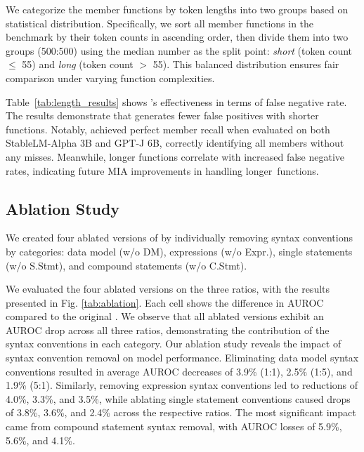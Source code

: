 We categorize the member functions by token lengths into two groups based on statistical distribution. Specifically, we sort all member functions in the benchmark by their token counts in ascending order, then divide them into two groups (500:500) using the median number as the split point: \textit{short} (token count $\leq$ 55) and \textit{long} (token count $>$ 55). This balanced distribution ensures fair comparison under varying function complexities. 

Table~\ref{tab:length_results} shows \tool's effectiveness in terms of false negative rate. The results demonstrate that \tool generates fewer false positives with shorter functions. Notably, \tool achieved perfect member recall when evaluated on both StableLM-Alpha 3B and GPT-J 6B, correctly identifying all members without any misses. Meanwhile, longer functions correlate with increased false negative rates, indicating future MIA improvements in handling longer~functions. 

\subsection{Ablation Study}

We created four ablated versions of \tool by individually removing syntax conventions by categories: data model (w/o DM), expressions (w/o Expr.), single statements (w/o S.Stmt), and compound statements (w/o C.Stmt). 

We evaluated the four ablated versions on the three ratios, with the results presented in Fig. \ref{tab:ablation}. Each cell shows the difference in AUROC compared to the original \tool. We observe that all ablated versions exhibit an AUROC drop across all three ratios, demonstrating the contribution of the syntax conventions in each category. Our ablation study reveals the impact of syntax convention removal on model performance. Eliminating data model syntax conventions resulted in average AUROC decreases of 3.9\% (1:1), 2.5\% (1:5), and 1.9\% (5:1). Similarly, removing expression syntax conventions led to reductions of 4.0\%, 3.3\%, and 3.5\%, while ablating single statement conventions caused drops of 3.8\%, 3.6\%, and 2.4\% across the respective ratios. The most significant impact came from compound statement syntax removal, with AUROC losses of 5.9\%, 5.6\%, and 4.1\%.


